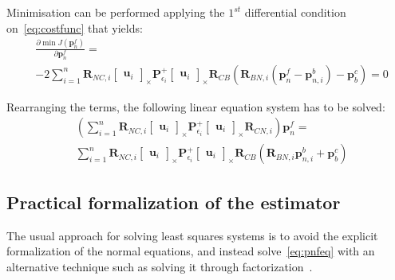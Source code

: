 Minimisation can be performed applying the $1^{st}$ differential condition on~\eqref{eq:costfunc} that yields:
\begin{equation}
\begin{aligned}
    & \frac{\partial\min J(\mathbf{p}_n^f)}{\partial\mathbf{p}_n^f} = \\ & -2\sum_{i=1}^n\mathbf{R}_{NC, i}\begin{bmatrix}
        \mathbf{u}_i
    \end{bmatrix}_\times \mathbf{P}_{\epsilon_i}^{+}\begin{bmatrix}
        \mathbf{u}_i
    \end{bmatrix}_\times \mathbf{R}_{CB}(\mathbf{R}_{BN, i}(\mathbf{p}_n^f-\mathbf{p}_{n, i}^b)-\mathbf{p}_b^c) = 0
\end{aligned}
\end{equation}

Rearranging the terms, the following linear equation system has to be solved:
\begin{equation}
\begin{aligned}
    & \left( \sum_{i=1}^n \mathbf{R}_{NC, i}\begin{bmatrix}
        \mathbf{u}_i
    \end{bmatrix}_\times \mathbf{P}_{\epsilon_i}^{+} \begin{bmatrix}
        \mathbf{u}_i
    \end{bmatrix}_\times \mathbf{R}_{CN, i} \right)\mathbf{p}_n^f = \\ & \sum_{i=1}^n \mathbf{R}_{NC, i} \begin{bmatrix}
        \mathbf{u}_i
    \end{bmatrix}_\times \mathbf{P}_{\epsilon_i}^{+} \begin{bmatrix}
        \mathbf{u}_i
    \end{bmatrix}_\times
    \mathbf{R}_{CB}(\mathbf{R}_{BN, i} \mathbf{p}_{n, i}^b + \mathbf{p}_b^c)
\end{aligned}
\label{eq:pnfeq}
\end{equation}

\subsection{Practical formalization of the estimator}

The usual approach for solving least squares systems is to avoid the explicit formalization of the normal equations, and instead solve~\eqref{eq:pnfeq} with an alternative technique such as solving it through factorization~\cite{matrixcomputations}. 

